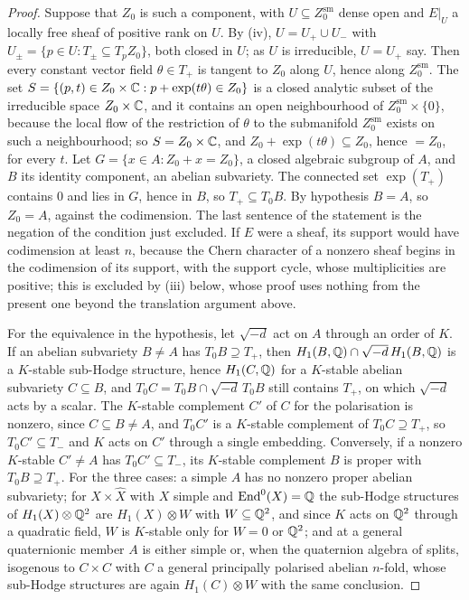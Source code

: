 \begin{proof}
Suppose that $Z_{0}$ is such a component, with $U\subseteq Z_{0}^{\mathrm{sm}}$
dense open and $E|_{U}$ a locally free sheaf of positive rank on $U$. By
(iv), $U=U_{+}\cup U_{-}$ with
$U_{\pm}=\{p\in U:T_{\pm}\subseteq T_{p}Z_{0}\}$, both closed in $U$; as $U$
is irreducible, $U=U_{+}$ say. Then every constant vector field
$\theta\in T_{+}$ is tangent to $Z_{0}$ along $U$, hence along
$Z_{0}^{\mathrm{sm}}$. The set
$S=\{(p,t)\in Z_{0}\times\mathbb{C}:p+\exp(t\theta)\in Z_{0}\}$ is a closed
analytic subset of the irreducible space $Z_{0}\times\mathbb{C}$, and it contains
an open neighbourhood of $Z_{0}^{\mathrm{sm}}\times\{0\}$, because the local
flow of the restriction of $\theta$ to the submanifold $Z_{0}^{\mathrm{sm}}$
exists on such a neighbourhood; so $S=Z_{0}\times\mathbb{C}$, and
$Z_{0}+\exp(t\theta)\subseteq Z_{0}$, hence $=Z_{0}$, for every $t$. Let
$G=\{x\in A:Z_{0}+x=Z_{0}\}$, a closed algebraic subgroup of $A$, and $B$
its identity component, an abelian subvariety. The connected set
$\exp(T_{+})$ contains $0$ and lies in $G$, hence in $B$, so
$T_{+}\subseteq T_{0}B$. By hypothesis $B=A$, so $Z_{0}=A$, against the
codimension. The last sentence of the statement is the negation of the
condition just excluded. If $E$ were a sheaf, its support would have
codimension at least $n$, because the Chern character of a nonzero sheaf
begins in the codimension of its support, with the support cycle, whose
multiplicities are positive; this is excluded by (iii)
below, whose proof uses nothing from the present one beyond the translation
argument above.

For the equivalence in the hypothesis, let $\sqrt{-d}$ act on $A$ through
an order of $K$. If an abelian subvariety $B\ne A$ has
$T_{0}B\supseteq T_{+}$, then $H_{1}(B,\mathbb{Q})\cap\sqrt{-d}\,H_{1}(B,\mathbb{Q})$ is a
$K$-stable sub-Hodge structure, hence $H_{1}(C,\mathbb{Q})$ for a $K$-stable abelian
subvariety $C\subseteq B$, and $T_{0}C=T_{0}B\cap\sqrt{-d}\,T_{0}B$ still
contains $T_{+}$, on which $\sqrt{-d}$ acts by a scalar. The $K$-stable
complement $C'$ of $C$ for the polarisation is nonzero, since
$C\subseteq B\ne A$, and $T_{0}C'$ is a $K$-stable complement of
$T_{0}C\supseteq T_{+}$, so $T_{0}C'\subseteq T_{-}$ and $K$ acts on $C'$
through a single embedding. Conversely, if a nonzero $K$-stable $C'\ne A$ has
$T_{0}C'\subseteq T_{-}$, its $K$-stable complement $B$ is proper with
$T_{0}B\supseteq T_{+}$. For the three cases: a simple $A$ has no nonzero
proper abelian subvariety; for $X\times\widehat X$ with $X$ simple and
$\operatorname{End}^{0}(X)=\mathbb{Q}$ the sub-Hodge structures of $H_{1}(X)\otimes\mathbb{Q}^{2}$ are
$H_{1}(X)\otimes W$ with $W\subseteq\mathbb{Q}^{2}$, and since $K$ acts on
$\mathbb{Q}^{2}$ through a quadratic field, $W$ is $K$-stable only for $W=0$ or
$\mathbb{Q}^{2}$; and at a general quaternionic member $A$ is either simple or, when
the quaternion algebra of  splits, isogenous to $C\times C$
with $C$ a general
principally polarised abelian $n$-fold, whose sub-Hodge structures are again
$H_{1}(C)\otimes W$ with the same conclusion.
\end{proof}

